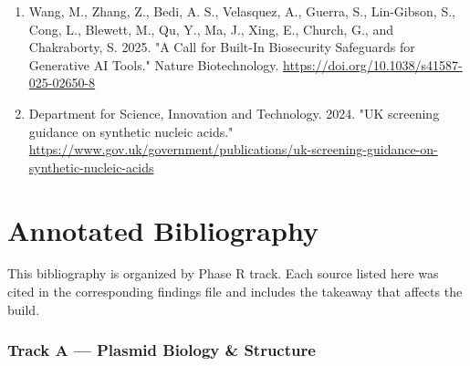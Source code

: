 \documentclass[11pt]{report}
\begin{document}
\begin{enumerate}
\item Wang, M., Zhang, Z., Bedi, A. S., Velasquez, A., Guerra, S., Lin-Gibson, S., Cong, L., Blewett, M., Qu, Y., Ma, J., Xing, E., Church, G., and Chakraborty, S. 2025. "A Call for Built-In Biosecurity Safeguards for Generative AI Tools." Nature Biotechnology. \url{https://doi.org/10.1038/s41587-025-02650-8}
\item Department for Science, Innovation and Technology. 2024. "UK screening guidance on synthetic nucleic acids." \url{https://www.gov.uk/government/publications/uk-screening-guidance-on-synthetic-nucleic-acids}
\end{enumerate}

\chapter{Annotated Bibliography}

This bibliography is organized by Phase R track. Each source listed here was cited in the corresponding findings file and includes the takeaway that affects the build.\par

\subsection{Track A — Plasmid Biology \& Structure}
\end{document}
